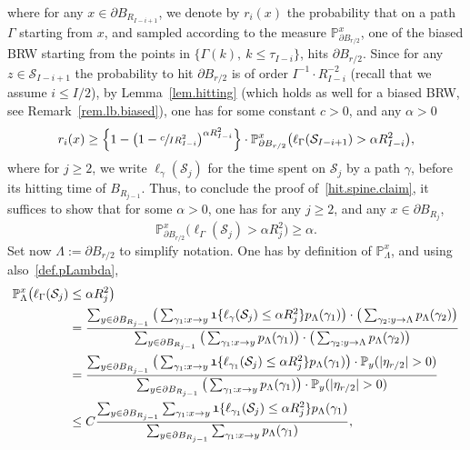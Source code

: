 \documentclass[11pt]{article}
\numberwithin{equation}{section}
\theoremstyle{plain}
\theoremstyle{definition}
\newcommand\cS{\mathcal{S}}
\newcommand{\1}{{\text{\Large $\mathfrak 1$}}}
\begin{document}
where for any $x\in \partial B_{R_{I-i+1}}$, we denote by $r_i(x)$ the probability that on a path $\Gamma$ starting from $x$,
and sampled according to the measure $\mathbb P^x_{\partial B_{r/2}}$, one of the biased BRW starting from the points in $\{\Gamma(k),\ k\le \tau_{I-i}\}$, hits
$\partial B_{r/2}$.
Since for any $z\in \mathcal S_{I-i+1}$ the probability
to hit $\partial B_{r/2}$ is of order $I^{-1}\cdot R_{I-i}^{-2}$
(recall that we assume $i\le I/2$), by Lemma~\ref{lem.hitting} (which holds as well for a biased BRW, see Remark~\ref{rem.lb.biased}), one has for some constant $c>0$, and any $\alpha>0$
\[
r_i(x) \ge \Big\{1 - \big(1-\sfrac{c}{IR_{I-i}^2}\big)^{\alpha R_{I-i}^2}\Big\} \cdot \mathbb P_{\partial B_{r/2}}^x\big(\ell_\Gamma(\cS_{I-i+1})
> \alpha R_{I-i}^2\big),
\]
where for $j\ge 2$, we write $\ell_\gamma(\cS_j)$
for the time spent on $\mathcal S_j$ by a path $\gamma$, before its hitting time of $B_{R_{j-1}}$.
Thus, to conclude the proof of~\eqref{hit.spine.claim}, it suffices to show that for some $\alpha>0$, one has for any $j\ge 2$, and any
$x\in \partial B_{R_j}$,
\begin{equation}\label{elljGamma}
\mathbb P_{\partial B_{r/2}}^x\big(\ell_\Gamma(\cS_j) > \alpha R_j^2\big) \ge \alpha.
\end{equation}
Set now $\Lambda:=\partial B_{r/2}$ to simplify notation. One has by definition of $\mathbb P_\Lambda^x$, and using also~\eqref{def.pLambda},
\begin{align*}
\mathbb P_\Lambda^x\big(\ell_\Gamma(\cS_j)&\le \alpha R_j^2\big)\\
& = \frac{\sum_{y\in \partial B_{R_{j-1}}} \big(\sum_{\gamma_1:x \to y}
\1\{\ell_\gamma(\cS_j)\le \alpha R_j^2\}
p_\Lambda(\gamma_1)\big)\cdot \big(\sum_{\gamma_2:y\to \Lambda} p_\Lambda(\gamma_2)\big)}
{\sum_{y\in \partial B_{R_{j-1}}} \big(\sum_{\gamma_1:x \to y} p_\Lambda(\gamma_1)\big)\cdot \big(\sum_{\gamma_2:y\to \Lambda} p_\Lambda(\gamma_2)\big)}\\
& = \frac{\sum_{y\in \partial B_{R_{j-1}}} \big(\sum_{\gamma_1:x \to y}
\1\{\ell_{\gamma_1}(\cS_j)\le \alpha R_j^2\} p_\Lambda(\gamma_1)\big)\cdot
\mathbb P_y(|\eta_{r/2}|>0)}
{\sum_{y\in \partial B_{R_{j-1}}}
\big(\sum_{\gamma_1:x \to y} p_\Lambda(\gamma_1)\big)\cdot \mathbb P_y(|\eta_{r/2}|>0)}\\
& \le C \frac{\sum_{y\in \partial B_{R_{j-1}}} \sum_{\gamma_1:x \to y}
\1\{\ell_{\gamma_1}(\cS_j)\le \alpha R_j^2\} p_\Lambda(\gamma_1)}
{\sum_{y\in \partial B_{R_{j-1}}}
\sum_{\gamma_1:x \to y} p_\Lambda(\gamma_1)},
\end{align*}
\end{document}
